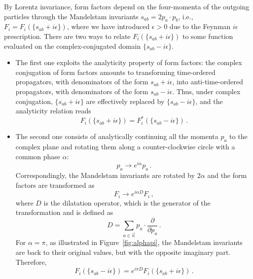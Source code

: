 By Lorentz invariance, form factors depend on the four-momenta of the outgoing particles through the Mandelstam invariants $s_{ab} = 2 p_a\cdot p_b$, i.e., $F_i = F_i(\{s_{ab}+i\epsilon\})$, where we have introduced $\epsilon>0$ due to the Feynman $i\epsilon$ prescription.
There are two ways to relate $F_i(\{s_{ab}+i\epsilon\})$ to some function evaluated on the complex-conjugated domain $\{s_{ab}-i\epsilon\}$.
\begin{itemize}
    \item The first one exploits the analyticity property of form factors: the complex conjugation of form factors amounts to transforming time-ordered propagators, with denominators of the form $s_{ab}+i\epsilon$, into anti-time-ordered propagators, with denominators of the form $s_{ab}-i\epsilon$.
    Thus, under complex conjugation, $\{s_{ab}+i\epsilon\}$ are effectively replaced by $\{s_{ab}-i\epsilon\}$, and the analyticity relation reads
    \begin{equation}\label{eq:partial1}
        F_i(\{s_{ab}+i\epsilon\}) = F^*_i(\{s_{ab}-i\epsilon\})\,.
    \end{equation}

    \item The second one consists of analytically continuing all the momenta $p_a$ to the complex plane and rotating them along a counter-clockwise circle with a common phase $\alpha$:
    \begin{equation}
        p_a \longrightarrow e^{i\alpha}p_a\,.
    \end{equation}
    Correspondingly, the Mandelstam invariants are rotated by $2 \alpha$ and the
    form factors are transformed as
    \begin{equation}
        F_i \longrightarrow e^{i\alpha D} F_i \,,
    \end{equation}
    where $D$ is the dilatation operator, which is the generator of the transformation and is defined as
    \begin{equation}
        D = \sum_{a\in\vec n} p_a \cdot \frac{\partial}{\partial p_a}\,.
    \end{equation}
    For $\alpha=\pi$, as illustrated in Figure~\ref{fig:alphapi}, the Mandelstam invariants are back to their original values, but with the opposite imaginary part. Therefore,
    \begin{equation}\label{eq:partial2}
        F_i(\{s_{ab}-i\epsilon\}) = e^{i\pi D}  F_i(\{s_{ab}+i\epsilon\})\,.
    \end{equation}
\end{itemize}
%
 
